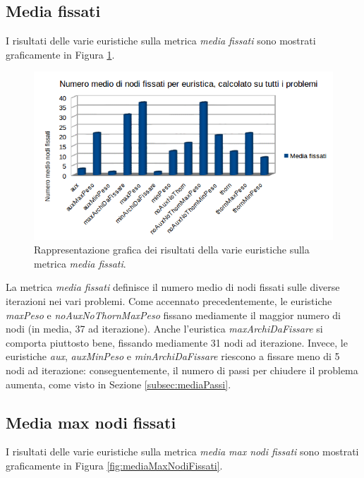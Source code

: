 \subsection{Media fissati}
I risultati delle varie euristiche sulla metrica \textit{media fissati} sono mostrati graficamente in Figura \ref{fig:mediaFissati}.

\begin{figure}[H]
\includegraphics[width=\textwidth]{res/img/nodiFissati.png}
\caption{Rappresentazione grafica dei risultati della varie euristiche sulla metrica \textit{media fissati}.}
\label{fig:mediaFissati}
\end{figure}

La metrica \textit{media fissati} definisce il numero medio di nodi fissati sulle diverse iterazioni nei vari problemi. Come accennato precedentemente, le euristiche \textit{maxPeso} e \textit{noAuxNoThornMaxPeso} fissano mediamente il maggior numero di nodi (in media, 37 ad iterazione). Anche l'euristica \textit{maxArchiDaFissare} si comporta piuttosto bene, fissando mediamente 31 nodi ad iterazione. Invece, le euristiche \textit{aux}, \textit{auxMinPeso} e \textit{minArchiDaFissare} riescono a fissare meno di 5 nodi ad iterazione: conseguentemente, il numero di passi per chiudere il problema aumenta, come visto in Sezione \ref{subsec:mediaPassi}.

\subsection{Media max nodi fissati}
I risultati delle varie euristiche sulla metrica \textit{media max nodi fissati} sono mostrati graficamente in Figura \ref{fig:mediaMaxNodiFissati}.

